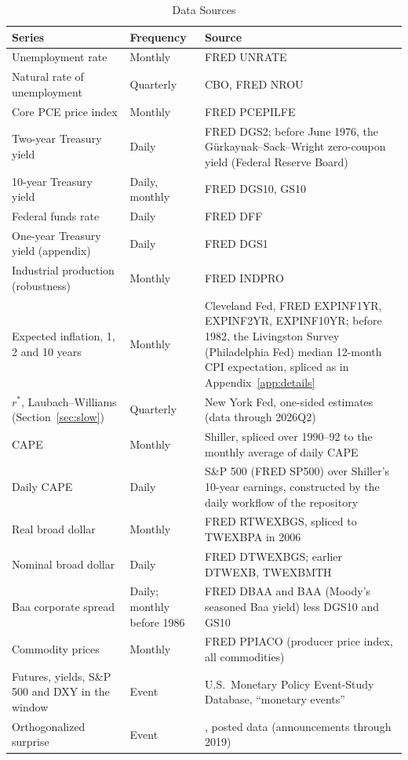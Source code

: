 \documentclass[11pt]{article}
\newcommand{\rs}{r^{*}}
\begin{document}
\begin{appendices}
\begin{table}[tp]\centering\small
\caption{Data Sources}\label{tab:data}
\begin{tabular}{p{}p{}p{}}\toprule
Series & Frequency & Source \\\midrule
Unemployment rate & Monthly & FRED UNRATE \\
Natural rate of unemployment & Quarterly & CBO, FRED NROU \\
Core PCE price index & Monthly & FRED PCEPILFE \\
Two-year Treasury yield & Daily & FRED DGS2; before June 1976, the Gürkaynak--Sack--Wright zero-coupon yield \citep{gurkaynak2007} (Federal Reserve Board) \\
10-year Treasury yield & Daily, monthly & FRED DGS10, GS10 \\
Federal funds rate & Daily & FRED DFF \\
One-year Treasury yield (appendix) & Daily & FRED DGS1 \\
Industrial production (robustness) & Monthly & FRED INDPRO \\
Expected inflation, 1, 2 and 10 years & Monthly & Cleveland Fed, FRED EXPINF1YR, EXPINF2YR, EXPINF10YR; before 1982, the Livingston Survey (Philadelphia Fed) median 12-month CPI expectation, spliced as in Appendix~\ref{app:details} \\
$\rs$, Laubach--Williams (Section~\ref{sec:slow}) & Quarterly & New York Fed, one-sided estimates (data through 2026Q2) \\
CAPE & Monthly & Shiller, spliced over 1990--92 to the monthly average of daily CAPE \\
Daily CAPE & Daily & S\&P 500 (FRED SP500) over Shiller's 10-year earnings, constructed by the daily workflow of the repository \\
Real broad dollar & Monthly & FRED RTWEXBGS, spliced to TWEXBPA in 2006 \\
Nominal broad dollar & Daily & FRED DTWEXBGS; earlier DTWEXB, TWEXBMTH \\
Baa corporate spread & Daily; monthly before 1986 & FRED DBAA and BAA (Moody's seasoned Baa yield) less DGS10 and GS10 \\
Commodity prices & Monthly & FRED PPIACO (producer price index, all commodities) \\
Futures, yields, S\&P 500 and DXY in the window & Event & U.S.\ Monetary Policy Event-Study Database, ``monetary events'' \citep{acosta2025} \\
Orthogonalized surprise & Event & \citet{bauer2023}, posted data (announcements through 2019) \\
\end{tabular}
\end{table}

\end{appendices}
\end{document}
